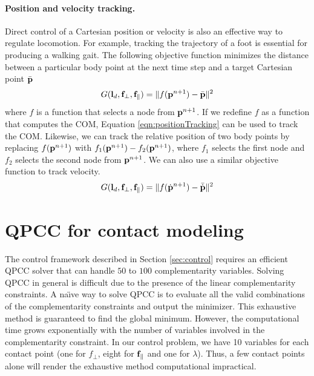 \paragraph{Position and velocity tracking.}
Direct control of a Cartesian position or velocity is also an effective
way to regulate locomotion. For example, tracking the trajectory of a foot
is essential for producing a walking gait. The following objective function minimizes the distance between a particular body point at the next time step and a target Cartesian point $\bar{\mathbf{p}}$
\begin{equation}
G(\mathbf{l}_d, \mathbf{f}_\perp, \mathbf{f}_\parallel) = \| f(\mathbf{p}^{n+1}) - \bar{\mathbf{p}} \|^2
\label{eqn:positionTracking}
\end{equation}
where $f$ is a function that selects a node from $\mathbf{p}^{n+1}$. If we redefine $f$ as a function that computes the COM, Equation \ref{eqn:positionTracking} can be used to track the COM. Likewise, we can track the relative position of two body points by replacing $f(\mathbf{p}^{n+1})$ with $f_1(\mathbf{p}^{n+1}) - f_2(\mathbf{p}^{n+1})$, where $f_1$ selects the first node and $f_2$ selects the second node from $\mathbf{p}^{n+1}$. We can also use a similar objective function to track velocity.
\begin{equation}
G(\mathbf{l}_d, \mathbf{f}_\perp, \mathbf{f}_\parallel) = \| f(\dot{\mathbf{p}}^{n+1}) - \bar{\dot{\mathbf{p}}} \|^2
\label{eqn:velocityTracking}
\end{equation}


\section{QPCC for contact modeling}
\label{sec:QPCC}

The control framework described in Section \ref{sec:control} requires
an efficient QPCC solver that can handle $50$ to $100$ complementarity
variables. Solving QPCC in general is difficult due to the presence of
the linear complementarity constraints. A na\"{\i}ve way to solve QPCC is
to evaluate all the valid combinations of the complementarity
constraints and output the minimizer. This exhaustive method is
guaranteed to find the global minimum. However, the computational time
grows exponentially with the number of variables involved in the
complementarity constraint. In our control problem, we have 10
variables for each contact point (one for $f_\perp$, eight for
$\mathbf{f}_\parallel$ and one for $\lambda$). Thus, a few contact points
alone will render the exhaustive method computational impractical.

